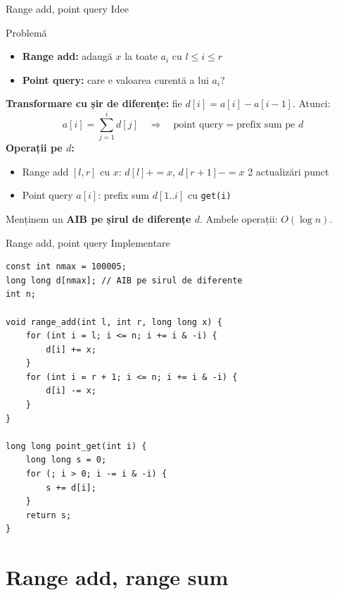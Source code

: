\documentclass[10pt]{beamer}
\begin{document}
\begin{frame}{Range add, point query \textemdash{} Idee}
  \begin{block}{Problemă}
    \begin{itemize}\itemsep0pt
      \item \textbf{Range add:} adaugă $x$ la toate $a_i$ cu $l \leq i \leq r$
      \item \textbf{Point query:} care e valoarea curentă a lui $a_i$?
    \end{itemize}
  \end{block}
  \smallskip
  \textbf{Transformare cu șir de diferențe:} fie $d[i] = a[i] - a[i-1]$. Atunci:
  \[
    a[i] = \sum_{j=1}^{i} d[j] \quad \Rightarrow \quad
    \text{point query} = \text{prefix sum pe } d
  \]
  \textbf{Operații pe $d$:}
  \begin{itemize}\itemsep0pt
    \item Range add $[l,r]$ cu $x$: $d[l] {+}{=} x$, $d[r{+}1] {-}{=} x$ \textemdash{} 2 actualizări punct
    \item Point query $a[i]$: prefix sum $d[1..i]$ cu \texttt{get(i)}
  \end{itemize}
  \smallskip
  Menținem un \textbf{AIB pe șirul de diferențe $d$}.
  Ambele operații: $O(\log n)$.
\end{frame}

\begin{frame}[fragile]{Range add, point query \textemdash{} Implementare}
  \begin{lstlisting}
const int nmax = 100005;
long long d[nmax]; // AIB pe sirul de diferente
int n;

void range_add(int l, int r, long long x) {
    for (int i = l; i <= n; i += i & -i) {
        d[i] += x;
    }
    for (int i = r + 1; i <= n; i += i & -i) {
        d[i] -= x;
    }
}

long long point_get(int i) {
    long long s = 0;
    for (; i > 0; i -= i & -i) {
        s += d[i];
    }
    return s;
}
  \end{lstlisting}
\end{frame}

\section{Range add, range sum}
\end{document}
